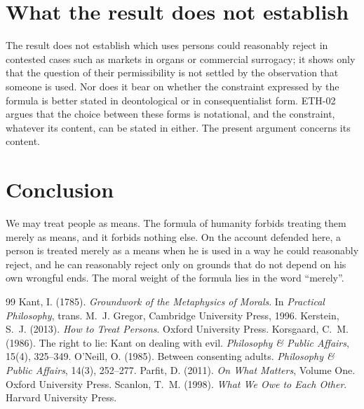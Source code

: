 \documentclass{situationist-preprint}
\begin{document}
\section{What the result does not establish}

The result does not establish which uses persons could reasonably reject in contested cases such as markets in organs or commercial surrogacy; it shows only that the question of their permissibility is not settled by the observation that someone is used. Nor does it bear on whether the constraint expressed by the formula is better stated in deontological or in consequentialist form. ETH-02 argues that the choice between these forms is notational, and the constraint, whatever its content, can be stated in either. The present argument concerns its content.

\section{Conclusion}

We may treat people as means. The formula of humanity forbids treating them merely as means, and it forbids nothing else. On the account defended here, a person is treated merely as a means when he is used in a way he could reasonably reject, and he can reasonably reject only on grounds that do not depend on his own wrongful ends. The moral weight of the formula lies in the word \enquote{merely}.

\begin{thebibliography}{99}\small
{} Kant, I. (1785). \emph{Groundwork of the Metaphysics of Morals}. In \emph{Practical Philosophy}, trans. M.~J. Gregor, Cambridge University Press, 1996.
 Kerstein, S.~J. (2013). \emph{How to Treat Persons}. Oxford University Press.
 Korsgaard, C.~M. (1986). The right to lie: Kant on dealing with evil. \emph{Philosophy \& Public Affairs}, 15(4), 325--349.
 O'Neill, O. (1985). Between consenting adults. \emph{Philosophy \& Public Affairs}, 14(3), 252--277.
 Parfit, D. (2011). \emph{On What Matters}, Volume One. Oxford University Press.
 Scanlon, T.~M. (1998). \emph{What We Owe to Each Other}. Harvard University Press.
\end{thebibliography}
\end{document}
